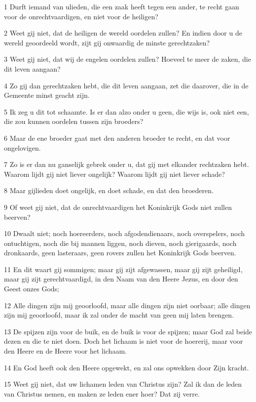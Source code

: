 \par 1 Durft iemand van ulieden, die een zaak heeft tegen een ander, te recht gaan voor de onrechtvaardigen, en niet voor de heiligen?
\par 2 Weet gij niet, dat de heiligen de wereld oordelen zullen? En indien door u de wereld geoordeeld wordt, zijt gij onwaardig de minste gerechtzaken?
\par 3 Weet gij niet, dat wij de engelen oordelen zullen? Hoeveel te meer de zaken, die dit leven aangaan?
\par 4 Zo gij dan gerechtzaken hebt, die dit leven aangaan, zet die daarover, die in de Gemeente minst geacht zijn.
\par 5 Ik zeg u dit tot schaamte. Is er dan alzo onder u geen, die wijs is, ook niet een, die zou kunnen oordelen tussen zijn broeders?
\par 6 Maar de ene broeder gaat met den anderen broeder te recht, en dat voor ongelovigen.
\par 7 Zo is er dan nu ganselijk gebrek onder u, dat gij met elkander rechtzaken hebt. Waarom lijdt gij niet liever ongelijk? Waarom lijdt gij niet liever schade?
\par 8 Maar gijlieden doet ongelijk, en doet schade, en dat den broederen.
\par 9 Of weet gij niet, dat de onrechtvaardigen het Koninkrijk Gods niet zullen beerven?
\par 10 Dwaalt niet; noch hoereerders, noch afgodendienaars, noch overspelers, noch ontuchtigen, noch die bij mannen liggen, noch dieven, noch gierigaards, noch dronkaards, geen lasteraars, geen rovers zullen het Koninkrijk Gods beerven.
\par 11 En dit waart gij sommigen; maar gij zijt afgewassen, maar gij zijt geheiligd, maar gij zijt gerechtvaardigd, in den Naam van den Heere Jezus, en door den Geest onzes Gods;
\par 12 Alle dingen zijn mij geoorloofd, maar alle dingen zijn niet oorbaar; alle dingen zijn mij geoorloofd, maar ik zal onder de macht van geen mij laten brengen.
\par 13 De spijzen zijn voor de buik, en de buik is voor de spijzen; maar God zal beide dezen en die te niet doen. Doch het lichaam is niet voor de hoererij, maar voor den Heere en de Heere voor het lichaam.
\par 14 En God heeft ook den Heere opgewekt, en zal ons opwekken door Zijn kracht.
\par 15 Weet gij niet, dat uw lichamen leden van Christus zijn? Zal ik dan de leden van Christus nemen, en maken ze leden ener hoer? Dat zij verre.
